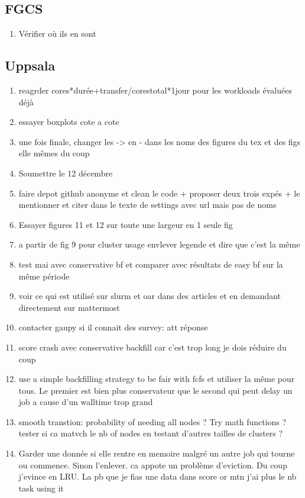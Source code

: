 \documentclass[a4paper]{article}
\begin{document}
	\subsection{FGCS}
		\begin{enumerate}
			\item Vérifier où ils en sont
		\end{enumerate}
	\subsection{Uppsala}
		\begin{enumerate}
			\item reagrder cores*durée+transfer/corestotal*1jour pour les workloads évaluées déjà
			\item essayer boxplots cote a cote
		
			\item une fois finale, changer les -> en - dans les noms des figures du tex et des figs elle mêmes du coup
			\item Soumettre le 12 décembre
			\item faire depot github anonyme et clean le code + proposer deux trois expés + le mentionner et citer dans le texte de settings avec url mais pas de noms
			\item Essayer figures 11 et 12 sur toute une largeur en 1 seule fig 
			\item a partir de fig 9 pour cluster usage envlever legende et dire que c'est la même



			
			
			
			
			
			
			
			
			
			
			
			\item test mai avec conservative bf et comparer avec résultats de easy bf sur la même période
			\item voir ce qui est utilisé sur slurm et oar dans des articles et en demandant directement sur mattermost
			\item contacter gaupy si il connait des survey: att réponse
			
			\item score crash avec conservative backfill car c'est trop long je dois réduire du coup
		
			\item use a simple backfilling strategy to be fair with fcfs et utiliser la même pour tous. Le premier est bien plus conservateur que le second qui peut delay un job a cause d'un walltime trop grand
			\item smooth transtion: probability of needing all nodes ? Try math functions ? tester si ca matvch le nb of nodes en testant d'autres tailles de clusters ?
			\item Garder une donnée si elle rentre en memoire malgré un autre job qui tourne ou commence. Sinon l'enlever. ca appote un problème d'eviction. Du coup j'evince en LRU. La pb que je fias une data dans score or mtn j'ai plus le nb task using it
		

\end{enumerate}
\end{document}
